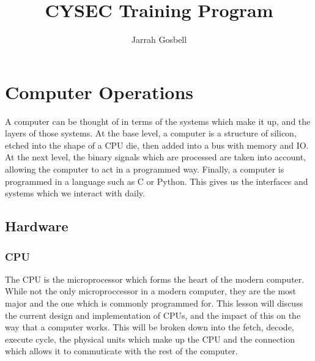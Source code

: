 \documentclass[a4paper,11pt]{article}
\author{Jarrah Gosbell}
\title{CYSEC Training Program}
\begin{document}
\maketitle
\tableofcontents
\newpage
\section{Computer Operations}
	A computer can be thought of in terms of the systems which make it up, and the layers of those systems.
	At the base level, a computer is a structure of silicon, etched into the shape of a CPU die, then added into a bus with memory and IO.
	At the next level, the binary signals which are processed are taken into account, allowing the computer to act in a programmed way. 
	Finally, a computer is programmed in a language such as C or Python. This gives us the interfaces and systems which we interact with daily. 
	\subsection{Hardware}
		\subsubsection{CPU} 
			The CPU is the microprocessor which forms the heart of the modern computer. 
			While not the only microproccessor in a modern computer, they are the most major and the one which is commonly programmed for. 
			This lesson will discuss the current design and implementation of CPUs, and the impact of this on the way that a computer works. 
			This will be broken down into the fetch, decode, execute cycle, the physical units which make up the CPU and the connection which allows it to commuticate with the rest of the computer. 
\end{document}
